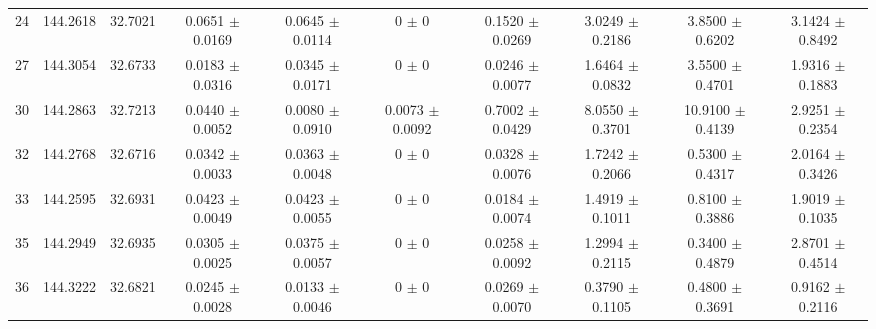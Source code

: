 \begin{table*}
\begin{adjustbox}{width=\textwidth, center}
\begin{tabular}{cccccccccc}
        24 &144.2618 & 32.7021 & 0.0651 $\pm$ 0.0169 & 0.0645 $\pm$ 0.0114 & 0 $\pm$ 0 & 0.1520 $\pm$ 0.0269 & 3.0249 $\pm$ 0.2186 & 3.8500 $\pm$ 0.6202 & 3.1424 $\pm$ 0.8492 \\
        27 &144.3054 & 32.6733 & 0.0183 $\pm$ 0.0316 & 0.0345 $\pm$ 0.0171 & 0 $\pm$ 0 & 0.0246 $\pm$ 0.0077 & 1.6464 $\pm$ 0.0832 & 3.5500 $\pm$ 0.4701 & 1.9316 $\pm$ 0.1883 \\
        30 &144.2863 & 32.7213 & 0.0440 $\pm$ 0.0052 & 0.0080 $\pm$ 0.0910 & 0.0073 $\pm$ 0.0092 & 0.7002 $\pm$ 0.0429 & 8.0550 $\pm$ 0.3701 & 10.9100 $\pm$ 0.4139 & 2.9251 $\pm$ 0.2354 \\
        32 &144.2768 & 32.6716 & 0.0342 $\pm$ 0.0033 & 0.0363 $\pm$ 0.0048 & 0 $\pm$ 0 & 0.0328 $\pm$ 0.0076 & 1.7242 $\pm$ 0.2066 & 0.5300 $\pm$ 0.4317 & 2.0164 $\pm$ 0.3426 \\
        33 &144.2595 & 32.6931 & 0.0423 $\pm$ 0.0049 & 0.0423 $\pm$ 0.0055 & 0 $\pm$ 0 & 0.0184 $\pm$ 0.0074 & 1.4919 $\pm$ 0.1011 & 0.8100 $\pm$ 0.3886 & 1.9019 $\pm$ 0.1035 \\
        35 &144.2949 & 32.6935 & 0.0305 $\pm$ 0.0025 & 0.0375 $\pm$ 0.0057 & 0 $\pm$ 0 & 0.0258 $\pm$ 0.0092 & 1.2994 $\pm$ 0.2115 & 0.3400 $\pm$ 0.4879 & 2.8701 $\pm$ 0.4514 \\
        36 &144.3222 & 32.6821 & 0.0245 $\pm$ 0.0028 & 0.0133 $\pm$ 0.0046 & 0 $\pm$ 0 & 0.0269 $\pm$ 0.0070 & 0.3790 $\pm$ 0.1105 & 0.4800 $\pm$ 0.3691 & 0.9162 $\pm$ 0.2116 \\

\end{tabular}
\end{adjustbox}
\end{table*}
